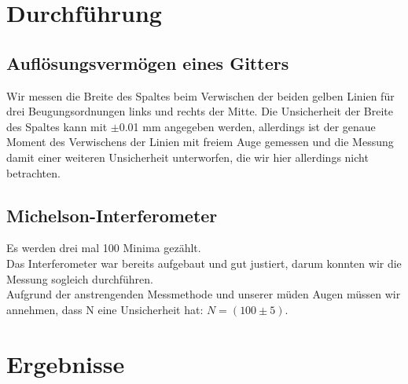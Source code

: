 \documentclass{article}
\begin{document}
\section{Durchführung}
\subsection{Auflösungsvermögen eines Gitters}
Wir messen die Breite des Spaltes beim Verwischen der beiden gelben Linien für drei Beugungsordnungen links und rechts der Mitte. Die Unsicherheit der Breite des Spaltes kann mit $\pm$0.01 mm angegeben werden, allerdings ist der genaue Moment des Verwischens der Linien mit freiem Auge gemessen und die Messung damit einer weiteren Unsicherheit unterworfen, die wir hier allerdings nicht betrachten.
\subsection{Michelson-Interferometer}
Es werden drei mal 100 Minima gezählt.\\
Das Interferometer war bereits aufgebaut und gut justiert, darum konnten wir die Messung sogleich durchführen.\\
Aufgrund der anstrengenden Messmethode und unserer müden Augen müssen wir annehmen, dass N eine Unsicherheit hat: $N=(100 \pm 5)$.

\section{Ergebnisse}
\end{document}
